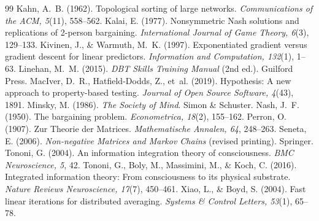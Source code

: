 \documentclass[11pt]{article}
\theoremstyle{definition}
\theoremstyle{remark}
\begin{document}
\begin{thebibliography}{99}
 Kahn, A.~B. (1962). Topological sorting of large networks. \emph{Communications of the ACM, 5}(11), 558--562.
 Kalai, E. (1977). Nonsymmetric Nash solutions and replications of 2-person bargaining. \emph{International Journal of Game Theory, 6}(3), 129--133.
 Kivinen, J., \& Warmuth, M.~K. (1997). Exponentiated gradient versus gradient descent for linear predictors. \emph{Information and Computation, 132}(1), 1--63.
 Linehan, M.~M. (2015). \emph{DBT Skills Training Manual} (2nd ed.). Guilford Press.
 MacIver, D.~R., Hatfield-Dodds, Z., et~al. (2019). Hypothesis: A new approach to property-based testing. \emph{Journal of Open Source Software, 4}(43), 1891.
 Minsky, M. (1986). \emph{The Society of Mind}. Simon \& Schuster.
 Nash, J.~F. (1950). The bargaining problem. \emph{Econometrica, 18}(2), 155--162.
 Perron, O. (1907). Zur Theorie der Matrices. \emph{Mathematische Annalen, 64}, 248--263.
 Seneta, E. (2006). \emph{Non-negative Matrices and Markov Chains} (revised printing). Springer.
 Tononi, G. (2004). An information integration theory of consciousness. \emph{BMC Neuroscience, 5}, 42.
 Tononi, G., Boly, M., Massimini, M., \& Koch, C. (2016). Integrated information theory: From consciousness to its physical substrate. \emph{Nature Reviews Neuroscience, 17}(7), 450--461.
 Xiao, L., \& Boyd, S. (2004). Fast linear iterations for distributed averaging. \emph{Systems \& Control Letters, 53}(1), 65--78.
\end{thebibliography}
\end{document}
